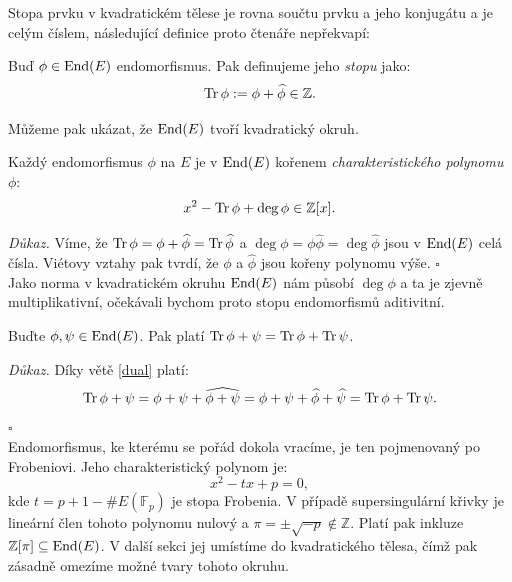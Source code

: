 \documentclass [12pt]{report}
\begin{document}
Stopa prvku v kvadratickém tělese je rovna součtu prvku a jeho konjugátu a je celým číslem, následující definice proto čtenáře nepřekvapí:
\begin{definice}
Buď $\phi \in \operatorname{End}(E)$ endomorfismus. Pak definujeme jeho \textit{stopu} jako:
\begin{equation*}
\operatorname{Tr} \phi := \phi+\widehat{\phi} \in \mathbb{Z}.
\end{equation*}
\end{definice} 

Můžeme pak ukázat, že $\operatorname{End}(E)$ tvoří kvadratický okruh.
\begin{veta}
Každý endomorfismus $\phi$ na $E$ je v $\operatorname{End}(E)$ kořenem \textit{charakteristického polynomu} $\phi$:
\begin{equation*}
x^2 - \operatorname{Tr} \phi + \deg \phi \in \mathbb{Z}[x].
\end{equation*}
\end{veta}
\noindent \textit{Důkaz.} Víme, že $\operatorname{Tr} \phi = \phi+ \widehat{\phi} = \operatorname{Tr} \widehat{\phi}$ a $\deg \phi = \phi \widehat{\phi} = \deg \widehat{\phi}$ jsou v $\operatorname{End}(E)$ celá čísla. Viétovy vztahy pak tvrdí, že $\phi$ a $\widehat{\phi}$ jsou kořeny polynomu výše. \hfill $\square$\\

Jako norma v kvadratickém okruhu $\operatorname{End}(E)$ nám působí $\deg \phi$ a ta je zjevně multiplikativní, očekávali bychom proto stopu endomorfismů aditivitní.

\begin{lemma}
Buďte $\phi, \psi \in \operatorname{End}(E)$. Pak platí $\operatorname{Tr} \phi+\psi = \operatorname{Tr} \phi + \operatorname{Tr} \psi$.
\end{lemma}
\noindent \textit{Důkaz.} Díky větě \ref{dual} platí:
\begin{equation*}
\operatorname{Tr}  \phi+\psi = \phi+\psi+\widehat{\phi+\psi} = \phi+\psi+\widehat{\phi}+\widehat{\psi} = \operatorname{Tr} \phi + \operatorname{Tr} \psi.
\end{equation*}
\hfill $\square$\\

Endomorfismus, ke kterému se pořád dokola vracíme, je ten pojmenovaný po Frobeniovi. Jeho charakteristický polynom je:
\begin{equation*}
x^2 - tx + p = 0,
\end{equation*}
kde $t = p+1-\# E(\mathbb{F}_p)$ je stopa Frobenia. V případě supersingulární křivky je lineární člen tohoto polynomu nulový a $\pi =  \pm \sqrt{-p} \not\in \mathbb{Z}$. Platí pak inkluze $\mathbb{Z}[\pi] \subseteq \operatorname{End}(E)$. V další sekci jej umístíme do kvadratického tělesa, čímž pak zásadně omezíme možné tvary tohoto okruhu.\\
\end{document}
